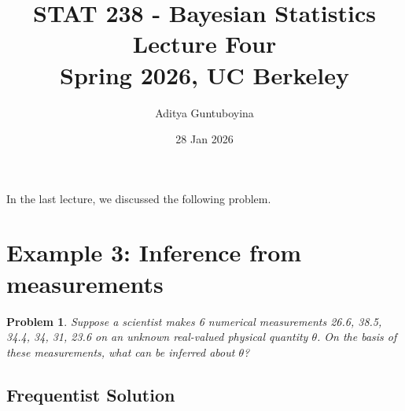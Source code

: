 \documentclass{scrartcl}
\newtheorem{problem}[theorem]{Problem}
\begin{document}
\title{STAT 238 - Bayesian Statistics  \\
  Lecture Four \\
  Spring 2026, UC Berkeley}

\author{Aditya Guntuboyina}


\date{28 Jan 2026}

\maketitle

In the last lecture, we discussed the following problem. 

\section{Example 3: Inference from measurements}

\begin{problem}\label{lik3}
  Suppose a scientist makes 6 numerical measurements 26.6, 38.5, 34.4,
  34, 31, 23.6 on an unknown real-valued physical quantity
  $\theta$. On the basis of these measurements, what can be inferred
  about $\theta$?  
\end{problem}

\subsection{Frequentist Solution}
\end{document}
